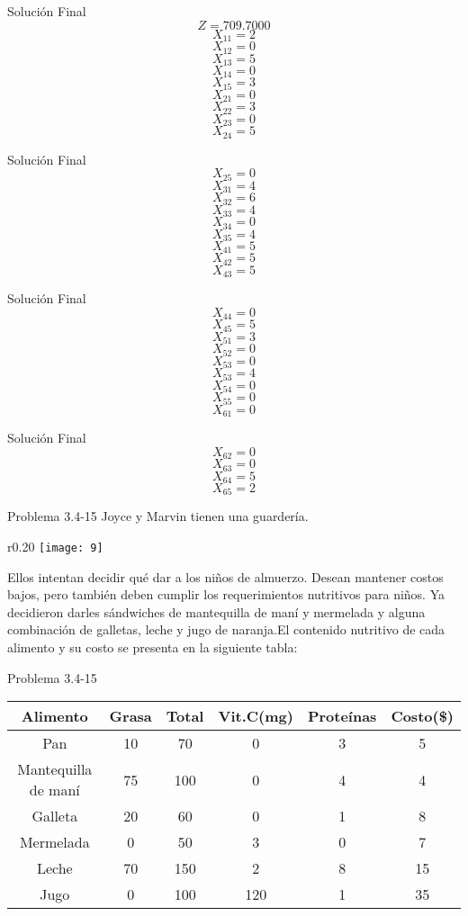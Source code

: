 \documentclass{beamer}
\begin{document}
\begin{frame}[fragile]{Soluci\'on Final}
\[Z = 709.7000 \]
\[X_{11} = 2\]
\[X_{12} = 0\]
\[X_{13} = 5\]
\[X_{14} = 0\]
\[X_{15} = 3\]
\[X_{21} = 0\]
\[X_{22} = 3\]
\[X_{23} = 0\]
\[X_{24} = 5\]
\end{frame}
\begin{frame}[fragile]{Soluci\'on Final}
\[X_{25} = 0\]
\[X_{31} = 4\]
\[X_{32} = 6\]
\[X_{33} = 4\]
\[X_{34} = 0\]
\[X_{35} = 4\]
\[X_{41} = 5\]
\[X_{42} = 5\]
\[X_{43} = 5\]
\end{frame}
\begin{frame}[fragile]{Soluci\'on Final}
\[X_{44} = 0\]
\[X_{45} = 5\]
\[X_{51} = 3\]
\[X_{52} = 0\]
\[X_{53} = 0\]
\[X_{53} = 4\]
\[X_{54} = 0\]
\[X_{55} = 0\]
\[X_{61} = 0\]
\end{frame}
\begin{frame}[fragile]{Soluci\'on Final}
\[X_{62} = 0\]
\[X_{63} = 0\]
\[X_{64} = 5\]
\[X_{65} = 2\]
\end{frame}

\begin{frame}[t,fragile]{Problema 3.4-15 }
Joyce y Marvin tienen una guarder\'ia.
\begin{wrapfigure}{r}{0.20\textwidth}
    \centering
    \texttt{[image: 9]}
\end{wrapfigure} Ellos intentan decidir qu\'e dar a los niños de almuerzo. Desean mantener costos bajos, pero tambi\'en deben cumplir los requerimientos nutritivos para niños. Ya decidieron darles s\'andwiches de mantequilla de man\'i y mermelada  y alguna combinaci\'on de galletas, leche y jugo de naranja.El contenido nutritivo de cada alimento y su costo se presenta en la siguiente tabla:\\
\end{frame}
\begin{frame}[t,fragile]{Problema 3.4-15 }
\begin{tabular}{|c|c|c|c|c|c|}
\hline 
Alimento & Grasa & Total & Vit.C(mg) & Prote\'inas & Costo(\$) \\ 
\hline 
Pan& 10 & 70 & 0 & 3 & 5 \\ 
\hline 
Mantequilla de man\'i& 75 & 100 & 0 & 4 & 4 \\ 
\hline 
Galleta  & 20 & 60 & 0 & 1 & 8 \\ 
\hline 
Mermelada  & 0 & 50 & 3 & 0 & 7 \\ 
\hline 
Leche  & 70 & 150 & 2 & 8 & 15 \\ 
\hline 
Jugo  & 0 & 100 & 120 & 1 & 35 \\ 
\hline 
\end{tabular}
\end{frame}
\end{document}
